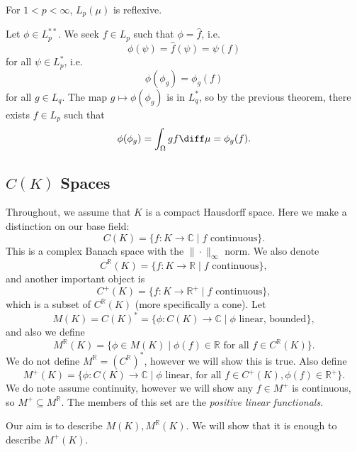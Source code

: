 \documentclass[12pt]{article}
\begin{document}
\begin{corollary}
	For $1 < p < \infty$, $L_p(\mu)$ is reflexive.
\end{corollary}

\begin{proofbox}
	Let $\phi \in L_p^{\ast\ast}$. We seek $f \in L_p$ such that $\phi = \hat f$, i.e.
	\[
	\phi(\psi) = \hat f(\psi) = \psi(f)
	\]
	for all $\psi \in L_p^\ast$, i.e.
	\[
	\phi(\phi_g) = \phi_g(f)
	\]
	for all $g \in L_q$. The map $g \mapsto \phi(\phi_g)$ is in $L_q^\ast$, so by the previous theorem, there exists $f \in L_p$ such that
	\[
	\phi(\phi_g) = \int_{\Omega} g f \diff \mu = \phi_g(f).
	\]
\end{proofbox}

\subsection{\texorpdfstring{$C(K)$}{C(K)} Spaces}%
\label{sub:ck_sp}

Throughout, we assume that $K$ is a compact Hausdorff space. Here we make a distinction on our base field:
\[
	C(K) = \{f : K \to \mathbb{C} \mid f \text{ continuous}\}.
\]
This is a complex Banach space with the $\|\cdot\|_\infty$ norm. We also denote
\[
	C^{\mathbb{R}}(K) = \{f : K \to \mathbb{R} \mid f \text{ continuous}\},
\]
and another important object is
\[
	C^+(K) = \{f : K \to \mathbb{R}^+ \mid f \text{ continuous}\},
\]
which is a subset of $C^{\mathbb{R}}(K)$ (more specifically a cone). Let
\[
	M(K) = C(K)^\ast =  \{ \phi : C(K) \to \mathbb{C} \mid \phi \text{ linear, bounded}\},
\]
and also we define
\[
	M^{\mathbb{R}}(K) = \{\phi \in M(K) \mid \phi(f) \in \mathbb{R} \text{ for all } f \in C^{\mathbb{R}}(K)\}.
\]
We do not define $M^{\mathbb{R}} = (C^{\mathbb{R}})^\ast$, however we will show this is true. Also define
\[
	M^+(K) = \{\phi : C(K) \to \mathbb{C} \mid \phi \text{ linear, for all } f \in C^+(K), \phi(f) \in \mathbb{R}^+\}.
\] 
We do note assume continuity, however we will show any $f \in M^+$ is continuous, so $M^+ \subseteq M^\mathbb{R}$. The members of this set are the \emph{positive linear functionals}.

Our aim is to describe $M(K), M^{\mathbb{R}}(K)$. We will show that it is enough to describe $M^+(K)$.
\end{document}
